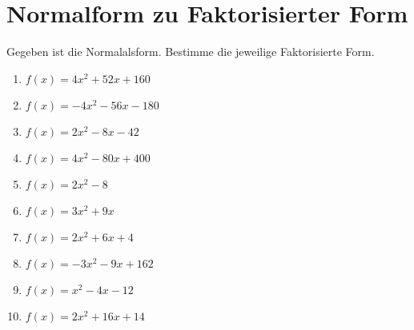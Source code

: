 \documentclass{article}%
\begin{document}
\section{Normalform zu Faktorisierter Form}%
\label{sec:NormalformzuFaktorisierterForm}%
Gegeben ist die Normalalsform. Bestimme die jeweilige Faktorisierte Form.%
\begin{enumerate}[label=\alph*)]%
\item%
\newline\vspace{0.5cm} $f(x)=4x^2 + 52x + 160$%
\item%
\newline\vspace{0.5cm} $f(x)=-4x^2 - 56x - 180$%
\item%
\newline\vspace{0.5cm} $f(x)=2x^2 - 8x - 42$%
\item%
\newline\vspace{0.5cm} $f(x)=4x^2 - 80x + 400$%
\item%
\newline\vspace{0.5cm} $f(x)=2x^2 - 8$%
\item%
\newline\vspace{0.5cm} $f(x)=3x^2 + 9x$%
\item%
\newline\vspace{0.5cm} $f(x)=2x^2 + 6x + 4$%
\item%
\newline\vspace{0.5cm} $f(x)=-3x^2 - 9x + 162$%
\item%
\newline\vspace{0.5cm} $f(x)=x^2 - 4x - 12$%
\item%
\newline\vspace{0.5cm} $f(x)=2x^2 + 16x + 14$%
\end{enumerate}

%
\end{document}

